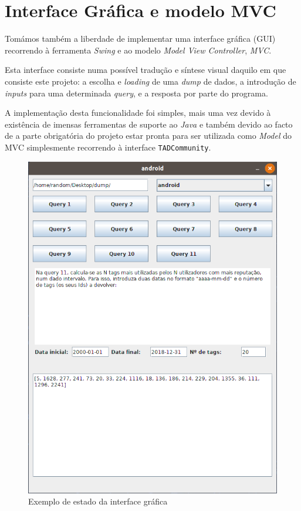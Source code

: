 \documentclass[10pt]{article}
\begin{document}
			
\pagebreak
\section{Interface Gráfica e modelo MVC}
	Tomámos também a liberdade de implementar uma interface 
gráfica (GUI) recorrendo à ferramenta \textit{Swing} e ao modelo
\textit{Model View Controller}, \emph{MVC}.

	Esta interface consiste numa possível tradução e síntese visual 
daquilo em que consiste este projeto: a escolha e \textit{loading} 
de uma \textit{dump} de dados, a introdução de \textit{inputs} para 
uma determinada \textit{query}, e a resposta por parte do programa.

	A implementação desta funcionalidade foi simples, mais uma vez 
devido à existência de imensas ferramentas de suporte ao \textit{Java} 
e também devido ao facto de a parte obrigatória do projeto estar 
pronta para ser utilizada como \textit{Model} do MVC simplesmente 
recorrendo à interface \texttt{TADCommunity}.

\begin{figure}[h]\centering
		\includegraphics[scale=0.6]{gui.png}
		\caption{Exemplo de estado da interface gráfica}
		\label{fig1:gui}

\end{figure}
	
\end{document}
